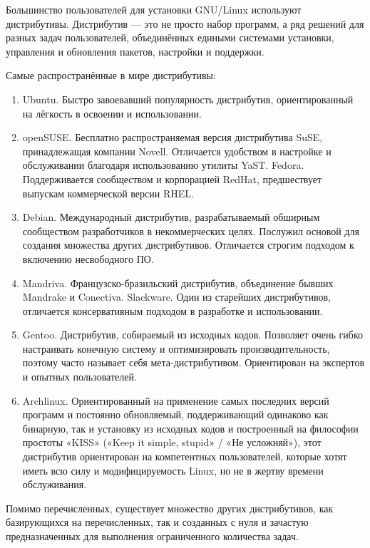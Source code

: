 Большинство пользователей для установки GNU/Linux используют дистрибутивы. Дистрибутив — это не просто набор программ, а ряд решений для разных задач пользователей, объединённых едиными системами установки, управления и обновления пакетов, настройки и поддержки.~\cite{linuxOffDoc}

Самые распространённые в мире дистрибутивы:
\begin{enumerate}

\item Ubuntu. Быстро завоевавший популярность дистрибутив, ориентированный на лёгкость в освоении и использовании.

\item openSUSE. Бесплатно распространяемая версия дистрибутива SuSE, принадлежащая компании Novell. Отличается удобством в настройке и обслуживании благодаря использованию утилиты YaST.
Fedora. Поддерживается сообществом и корпорацией RedHat, предшествует выпускам коммерческой версии RHEL.

\item Debian. Международный дистрибутив, разрабатываемый обширным сообществом разработчиков в некоммерческих целях. Послужил основой для создания множества других дистрибутивов. Отличается строгим подходом к включению несвободного ПО.
\item Mandriva. Французско-бразильский дистрибутив, объединение бывших Mandrake и Conectiva.
Slackware. Один из старейших дистрибутивов, отличается консервативным подходом в разработке и использовании.

\item Gentoo. Дистрибутив, собираемый из исходных кодов. Позволяет очень гибко настраивать конечную систему и оптимизировать производительность, поэтому часто называет себя мета-дистрибутивом. Ориентирован на экспертов и опытных пользователей.

\item Archlinux. Ориентированный на применение самых последних версий программ и постоянно обновляемый, поддерживающий одинаково как бинарную, так и установку из исходных кодов и построенный на философии простоты «KISS» («Keep it simple, stupid» / «Не усложняй»), этот дистрибутив ориентирован на компетентных пользователей, которые хотят иметь всю силу и модифицируемость Linux, но не в жертву времени обслуживания.
\end{enumerate}

Помимо перечисленных, существует множество других дистрибутивов, как базирующихся на перечисленных, так и созданных с нуля и зачастую предназначенных для выполнения ограниченного количества задач.

